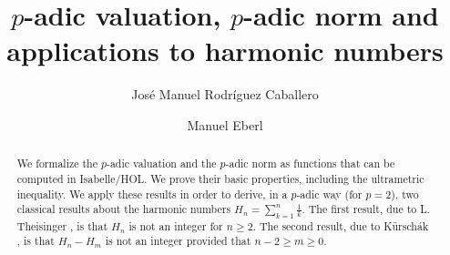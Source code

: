 \documentclass[11pt,a4paper]{article}
\begin{document}
\title{$p$-adic valuation, $p$-adic norm and applications to harmonic numbers}
\author{Jos\'e Manuel Rodr\'iguez Caballero \and Manuel Eberl}
\maketitle

\begin{abstract}
We formalize the $p$-adic valuation and the $p$-adic norm as functions that can be computed in Isabelle/HOL. We prove their basic properties, including the ultrametric inequality. We apply these results in order to derive, in a $p$-adic way (for $p = 2$), two classical results about the harmonic numbers $H_n = \sum_{k = 1}^n \frac{1}{k}$. The first result, due to L. Theisinger \cite{theisinger1915bemerkung}, is that $H_n$ is not an integer for $n \geq 2$. The second result, due to K{\"u}rsch{\'a}k \cite{kurschak1918harmonic}, is that $H_n - H_m$ is not an integer provided that $n-2 \geq m \geq 0$.
\end{abstract}

\tableofcontents






\end{document}
